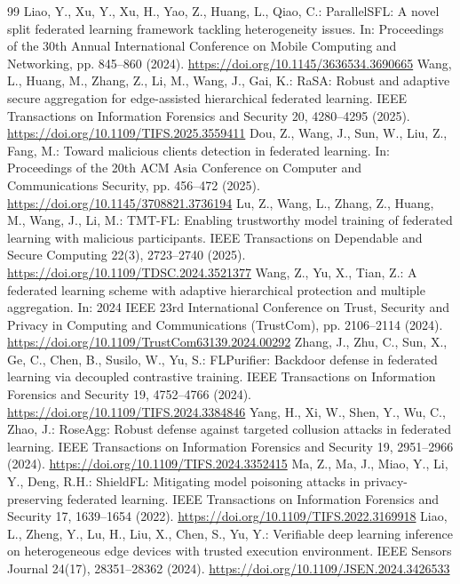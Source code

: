 \documentclass[11pt, a4paper, UTF8, fontset=fandol]{ctexart}
\begin{document}
\begin{thebibliography}{99}
     Liao, Y., Xu, Y., Xu, H., Yao, Z., Huang, L., Qiao, C.: ParallelSFL: A novel split federated learning framework tackling heterogeneity issues. In: Proceedings of the 30th Annual International Conference on Mobile Computing and Networking, pp. 845--860 (2024). \url{https://doi.org/10.1145/3636534.3690665}
     Wang, L., Huang, M., Zhang, Z., Li, M., Wang, J., Gai, K.: RaSA: Robust and adaptive secure aggregation for edge-assisted hierarchical federated learning. IEEE Transactions on Information Forensics and Security 20, 4280--4295 (2025). \url{https://doi.org/10.1109/TIFS.2025.3559411}
     Dou, Z., Wang, J., Sun, W., Liu, Z., Fang, M.: Toward malicious clients detection in federated learning. In: Proceedings of the 20th ACM Asia Conference on Computer and Communications Security, pp. 456--472 (2025). \url{https://doi.org/10.1145/3708821.3736194}
     Lu, Z., Wang, L., Zhang, Z., Huang, M., Wang, J., Li, M.: TMT-FL: Enabling trustworthy model training of federated learning with malicious participants. IEEE Transactions on Dependable and Secure Computing 22(3), 2723--2740 (2025). \url{https://doi.org/10.1109/TDSC.2024.3521377}
     Wang, Z., Yu, X., Tian, Z.: A federated learning scheme with adaptive hierarchical protection and multiple aggregation. In: 2024 IEEE 23rd International Conference on Trust, Security and Privacy in Computing and Communications (TrustCom), pp. 2106--2114 (2024). \url{https://doi.org/10.1109/TrustCom63139.2024.00292}
     Zhang, J., Zhu, C., Sun, X., Ge, C., Chen, B., Susilo, W., Yu, S.: FLPurifier: Backdoor defense in federated learning via decoupled contrastive training. IEEE Transactions on Information Forensics and Security 19, 4752--4766 (2024). \url{https://doi.org/10.1109/TIFS.2024.3384846}
     Yang, H., Xi, W., Shen, Y., Wu, C., Zhao, J.: RoseAgg: Robust defense against targeted collusion attacks in federated learning. IEEE Transactions on Information Forensics and Security 19, 2951--2966 (2024). \url{https://doi.org/10.1109/TIFS.2024.3352415}
     Ma, Z., Ma, J., Miao, Y., Li, Y., Deng, R.H.: ShieldFL: Mitigating model poisoning attacks in privacy-preserving federated learning. IEEE Transactions on Information Forensics and Security 17, 1639--1654 (2022). \url{https://doi.org/10.1109/TIFS.2022.3169918}
     Liao, L., Zheng, Y., Lu, H., Liu, X., Chen, S., Yu, Y.: Verifiable deep learning inference on heterogeneous edge devices with trusted execution environment. IEEE Sensors Journal 24(17), 28351--28362 (2024). \url{https://doi.org/10.1109/JSEN.2024.3426533}

\end{thebibliography}
\end{document}
